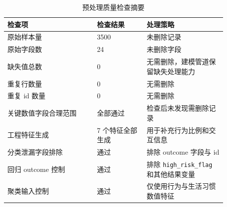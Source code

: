\begin{table}[H]
\centering
\caption{预处理质量检查摘要}
\label{tab:preprocessing-quality}
\begin{tabular}{p{0.36\linewidth}p{0.20\linewidth}p{0.32\linewidth}}
\toprule
检查项 & 检查结果 & 处理策略 \\
\midrule
原始样本量 & 3500 & 未删除记录 \\
原始字段数 & 24 & 未删除字段 \\
缺失值总数 & 0 & 无需删除，建模管道保留缺失处理能力 \\
重复行数量 & 0 & 无需删除 \\
重复 id 数量 & 0 & 无需删除 \\
关键数值字段合理范围 & 全部通过 & 检查后未发现需删除记录 \\
工程特征生成 & 7 个特征全部生成 & 用于补充行为比例和交互信息 \\
分类泄漏字段排除 & 通过 & 排除 outcome 字段与 id \\
回归 outcome 控制 & 通过 & 排除 \texttt{high\_risk\_flag} 和其他结果变量 \\
聚类输入控制 & 通过 & 仅使用行为与生活习惯数值特征 \\
\bottomrule
\end{tabular}
\end{table}
